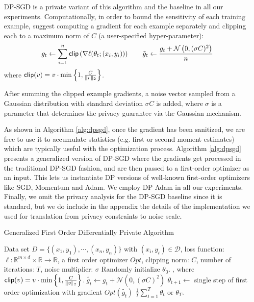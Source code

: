\documentclass[letterpaper]{article} \usepackage{fullpage}
\def\cD{\mathcal{D}}
\def\calN{\mathcal{N}}
\begin{document}
DP-SGD is a private variant of this algorithm and the baseline in all our experiments. Computationally, in order to bound the sensitivity of each training example, \cite{abadi2016dpsgd} suggest computing a gradient for each example separately and clipping each to a maximum norm of $C$ (a user-specified hyper-parameter):
\begin{align}
g_t \leftarrow \sum_{i=1}^n{\sf clip}\left(\nabla \ell(\theta_t;(x_i, y_i))\right) \qquad
\tilde g_{t} \leftarrow \frac{g_t + \calN\left(0, (\sigma C)^2\right)}{n}
\end{align}
where ${\sf clip}(v)=v\cdot\min\left\{1,\frac{C}{\|v\|_2}\right\}$.

After summing the clipped example gradients, a noise vector sampled from a Gaussian distribution with standard deviation $\sigma C$ is added, where $\sigma$ is a parameter that determines the privacy guarantee via the Gaussian mechanism. 


As shown in Algorithm \ref{alg:dpsgd}, once the gradient has been sanitized, we are free to use it to accumulate statistics (e.g. first or second moment estimates) which are typically useful with the optimization process. Algorithm \ref{alg:dpsgd} presents a generalized version of DP-SGD where the gradients get processed in the traditional DP-SGD fashion, and are then passed to a first-order optimizer as an input. This lets us instantiate DP versions of well-known first-order optimizers like SGD, Momentum and Adam. We employ DP-Adam in all our experiments. Finally, we omit the privacy analysis for the DP-SGD baseline since it is standard, but we do include in the appendix the details of the implementation we used for translation from privacy constraints to noise scale.

\begin{algorithm}[ht]
\caption{Generalized First Order Differentially Private Algorithm}
\begin{algorithmic}[1]
\REQUIRE Data set $D=\{(x_1, y_1),\cdots,(x_n, y_n)\}$ with $(x_i, y_i)\in \cD$, loss function: $\ell:\mathbb{R}^{m \times  d}\times\mathbb{R}\to\mathbb{R}$, a first order optimizer $Opt$, clipping norm: $C$, 
number of iterations: $T$, noise multiplier: $\sigma$
\STATE Randomly initialize $\theta_0$.
{, where {${\sf clip}(v)=v\cdot\min\left\{1,\frac{C}{\|v\|_2}\right\}$}.\label{step:clip}}
\STATE $\tilde{g_{t}} \leftarrow g_{t}+\calN\left(0,(\sigma C)^2\right)$
{\STATE $\theta_{t+1} \leftarrow$ {single step of first order optimization with gradient $Opt( \tilde{g_{t}})$}\label{step:noiseDPSGD}}
\ENDFOR
{ $\frac{1}{T}\sum\limits_{t=1}^T\theta_t$ or $\theta_T$\label{eq:lastDPSGD}.}
\end{algorithmic}
\label{alg:dpsgd}
\end{algorithm}
\end{document}
